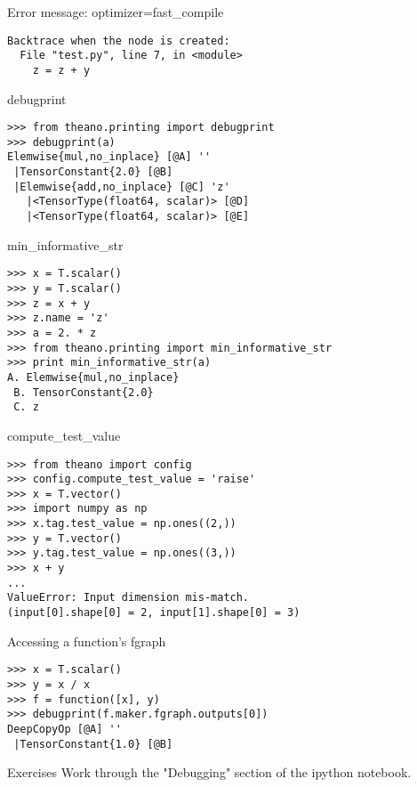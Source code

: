 \documentclass[utf8x,hyperref={pdfpagelabels=false}]{beamer}
\begin{document}
\begin{frame}[fragile]{Error message: optimizer=fast\_compile}
\begin{lstlisting}[style=output]
Backtrace when the node is created:
  File "test.py", line 7, in <module>
    z = z + y
\end{lstlisting}
\end{frame}

\begin{frame}[fragile]{debugprint}
\begin{lstlisting}
>>> from theano.printing import debugprint
>>> debugprint(a)
Elemwise{mul,no_inplace} [@A] ''
 |TensorConstant{2.0} [@B]
 |Elemwise{add,no_inplace} [@C] 'z'
   |<TensorType(float64, scalar)> [@D]
   |<TensorType(float64, scalar)> [@E]
\end{lstlisting}
\end{frame}

\begin{frame}[fragile]{min\_informative\_str}
\begin{lstlisting}
>>> x = T.scalar()
>>> y = T.scalar()
>>> z = x + y
>>> z.name = 'z'
>>> a = 2. * z
>>> from theano.printing import min_informative_str
>>> print min_informative_str(a)
A. Elemwise{mul,no_inplace}
 B. TensorConstant{2.0}
 C. z
\end{lstlisting}
\end{frame}

\begin{frame}[fragile]{compute\_test\_value}
\begin{lstlisting}
>>> from theano import config
>>> config.compute_test_value = 'raise'
>>> x = T.vector()
>>> import numpy as np
>>> x.tag.test_value = np.ones((2,))
>>> y = T.vector()
>>> y.tag.test_value = np.ones((3,))
>>> x + y
...
ValueError: Input dimension mis-match.
(input[0].shape[0] = 2, input[1].shape[0] = 3)
\end{lstlisting}
\end{frame}

\begin{frame}[fragile]{Accessing a function’s fgraph}
\begin{lstlisting}
>>> x = T.scalar()
>>> y = x / x
>>> f = function([x], y)
>>> debugprint(f.maker.fgraph.outputs[0])
DeepCopyOp [@A] ''
 |TensorConstant{1.0} [@B]
\end{lstlisting}
\end{frame}

\begin{frame}{Exercises}
Work through the "Debugging" section of the ipython notebook.
\end{frame}
\end{document}
